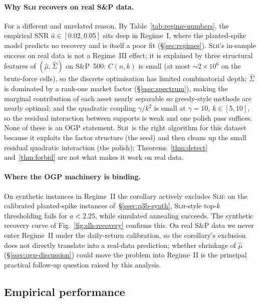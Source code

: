 \paragraph{Why \textsc{Slh} recovers on real S\&P data.}
For a different and unrelated reason. By Table~\ref{tab:regime-numbers}, the empirical
SNR $\hat a \in [0.02, 0.05]$ sits deep in Regime~I, where the planted-spike model
predicts no recovery and is itself a poor fit (\S\ref{sec:regimes}). \textsc{Slh}'s
in-sample success on real data is not a Regime~III effect; it is explained by three
structural features of $(\hat\mu, \hat\Sigma)$ on S\&P~500: $C(n,k)$ is small (at most
$\sim 2\times 10^6$ on the brute-force cells), so the discrete optimisation has limited
combinatorial depth; $\hat\Sigma$ is dominated by a rank-one market factor
(\S\ref{ssec:spectrum}), making the marginal contribution of each asset nearly
separable so greedy-style methods are nearly optimal; and the quadratic coupling
$\gamma/k^2$ is small at $\gamma=10$, $k\in[5,10]$, so the residual interaction between
supports is weak and one polish pass suffices. None of these is an OGP statement.
\textsc{Slh}\ is the right algorithm for this dataset because it exploits the factor
structure (the seed) and then cleans up the small residual quadratic interaction (the
polish); Theorems~\ref{thm:detect} and~\ref{thm:forbid} are not what makes it work on
real data.

\paragraph{Where the OGP machinery is binding.}
On synthetic instances in Regime~II the corollary actively excludes \textsc{Slh}: on
the calibrated planted-spike instances of~\S\ref{ssec:p3b-synth}, \textsc{Slh}-style
top-$k$ thresholding fails for $a < 2.25$, while simulated annealing succeeds. The
synthetic recovery curve of Fig.~\ref{fig:slh-recovery} confirms this. On real S\&P
data we never enter Regime~II under the daily-return calibration, so the corollary's
exclusion does not directly translate into a real-data prediction; whether shrinkage
of $\hat\mu$ (\S\ref{ssec:ogp-discussion}) could move the problem into Regime~II is
the principal practical follow-up question raised by this analysis.

\subsection{Empirical performance}\label{sec:slh-empirical}

